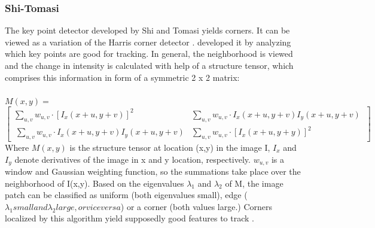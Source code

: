 \documentclass[Bachelorarbeit.tex]{subfiles}
\begin{document}
\subsubsection{Shi-Tomasi}
The key point detector developed by Shi and Tomasi yields corners. It can be viewed as a variation of the Harris corner detector \citep{harris1988combined}. \cite{shi1993good} developed it by analyzing which key points are good for tracking. In general, the neighborhood is viewed and the change in intensity is calculated with help of a structure tensor, which comprises this information in form of a symmetric 2 x 2 matrix:
\\
\\
	$M(x,y) =$
\begin{equation}
	\begin{bmatrix}
	\sum\limits_{u,v}w_{u,v}\cdot\left[I_x(x+u,y+v)\right]^2 & \sum\limits_{u,v}w_{u,v}\cdot I_x(x+u,y+v) I_y(x+u,y+v)~ \\
	~\sum\limits_{u,v}w_{u,v}\cdot I_x(x+u,y+v) I_y(x+u,y+v) & \sum\limits_{u,v}w_{u,v}\cdot\left[I_x(x+u,y+y)\right]^2
	\end{bmatrix}
\end{equation}
Where $M(x,y)$ is the structure tensor at location (x,y) in the image I, $I_x$ and $I_y$ denote derivatives of the image in x and y location, respectively. $w_{u,v}$ is a window and Gaussian weighting function, so the summations take place over the neighborhood of I(x,y). Based on the eigenvalues $\lambda_1$ and $\lambda_2$ of M, the image patch can be classified as uniform (both eigenvalues small), edge ($\lambda_1 small and \lambda_2 large, or vice versa$) or a corner (both values large.) Corners localized by this algorithm yield supposedly good features to track \citep[p. 3]{shi1993good}.
	
	
	
\end{document}
